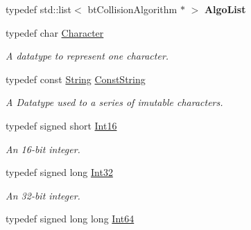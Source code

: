 \begin{DoxyCompactItemize}
\item 
\hypertarget{namespaceMezzanine_af18eb4e539728524f1a64ba1726ad9cc}{
typedef std::list$<$ btCollisionAlgorithm $\ast$ $>$ {\bfseries AlgoList}}
\label{namespaceMezzanine_af18eb4e539728524f1a64ba1726ad9cc}

\item 
typedef char \hyperlink{namespaceMezzanine_ad5147a419db7627ee552a2b582f1052d}{Character}
\begin{DoxyCompactList}\small\item\em A datatype to represent one character. \item\end{DoxyCompactList}\item 
typedef const \hyperlink{namespaceMezzanine_acf9fcc130e6ebf08e3d8491aebcf1c86}{String} \hyperlink{namespaceMezzanine_a63cd699ac54b73953f35ec9cfc05e506}{ConstString}
\begin{DoxyCompactList}\small\item\em A Datatype used to a series of imutable characters. \item\end{DoxyCompactList}\item 
\hypertarget{namespaceMezzanine_adb602bffcbc8f1b381b2f529e9e364f6}{
typedef signed short \hyperlink{namespaceMezzanine_adb602bffcbc8f1b381b2f529e9e364f6}{Int16}}
\label{namespaceMezzanine_adb602bffcbc8f1b381b2f529e9e364f6}

\begin{DoxyCompactList}\small\item\em An 16-\/bit integer. \item\end{DoxyCompactList}\item 
\hypertarget{namespaceMezzanine_a590a2f3eb4a187e1b25209e546e540e1}{
typedef signed long \hyperlink{namespaceMezzanine_a590a2f3eb4a187e1b25209e546e540e1}{Int32}}
\label{namespaceMezzanine_a590a2f3eb4a187e1b25209e546e540e1}

\begin{DoxyCompactList}\small\item\em An 32-\/bit integer. \item\end{DoxyCompactList}\item 
\hypertarget{namespaceMezzanine_ab203dfc8311caab7cc86ee5a0bf962ed}{
typedef signed long long \hyperlink{namespaceMezzanine_ab203dfc8311caab7cc86ee5a0bf962ed}{Int64}}
\label{namespaceMezzanine_ab203dfc8311caab7cc86ee5a0bf962ed}


\end{DoxyCompactItemize}
